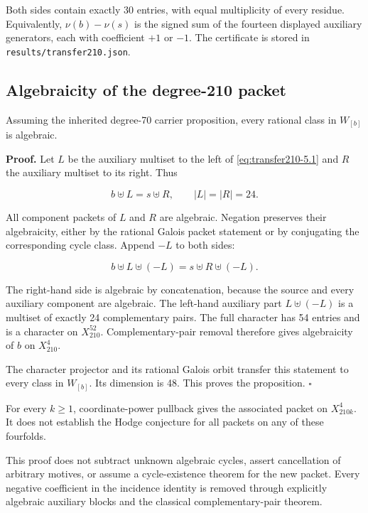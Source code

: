 Both sides contain exactly 30 entries, with equal multiplicity of every
residue. Equivalently, \(\nu(b)-\nu(s)\) is the signed sum of the
fourteen displayed auxiliary generators, each with coefficient \(+1\) or
\(-1\). The certificate is stored in \texttt{results/transfer210.json}.

\hypertarget{transfer210-algebraicity-of-the-degree-210-packet}{%
\subsection{Algebraicity of the degree-210
packet}\label{transfer210-algebraicity-of-the-degree-210-packet}}

Assuming the inherited degree-70 carrier proposition, every rational
class in \(W_{[b]}\) is algebraic.

\textbf{Proof.} Let \(L\) be the auxiliary multiset to the left of \eqref{eq:transfer210-5.1}
and \(R\) the auxiliary multiset to its right. Thus

\[
b\uplus L=s\uplus R,
\qquad |L|=|R|=24.
\]

All component packets of \(L\) and \(R\) are algebraic. Negation
preserves their algebraicity, either by the rational Galois packet
statement or by conjugating the corresponding cycle class. Append \(-L\)
to both sides:

\begin{equation}\label{eq:transfer210-5.2}
b\uplus L\uplus(-L)=s\uplus R\uplus(-L).\end{equation}

The right-hand side is algebraic by concatenation, because the source
and every auxiliary component are algebraic. The left-hand auxiliary
part \(L\uplus(-L)\) is a multiset of exactly 24 complementary pairs.
The full character has 54 entries and is a character on
\(X_{210}^{52}\). Complementary-pair removal therefore gives
algebraicity of \(b\) on \(X_{210}^4\).

The character projector and its rational Galois orbit transfer this
statement to every class in \(W_{[b]}\). Its dimension is 48. This
proves the proposition. \hfill\ensuremath{\square}

For every \(k\ge1\), coordinate-power pullback gives the associated
packet on \(X_{210k}^4\). It does not establish the Hodge conjecture for
all packets on any of these fourfolds.

This proof does not subtract unknown algebraic cycles, assert
cancellation of arbitrary motives, or assume a cycle-existence theorem
for the new packet. Every negative coefficient in the incidence identity
is removed through explicitly algebraic auxiliary blocks and the
classical complementary-pair theorem.

